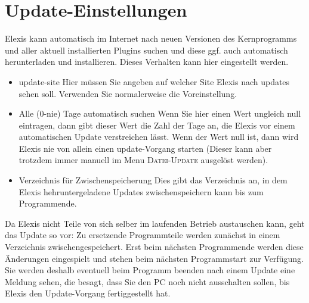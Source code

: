 \section{Update-Einstellungen}
Elexis kann automatisch im Internet nach neuen Versionen des Kernprogramms und aller aktuell installierten Plugins suchen und diese ggf. auch automatisch herunterladen und installieren. Dieses Verhalten kann hier eingestellt werden.
\begin{itemize}
\item{update-site} Hier müssen Sie angeben auf welcher Site Elexis nach updates sehen soll. Verwenden Sie normalerweise die Voreinstellung.
\item{Alle (0-nie) Tage automatisch suchen} Wenn Sie hier einen Wert ungleich null eintragen, dann gibt dieser Wert die Zahl der Tage an, die Elexis vor einem automatischen Update verstreichen lässt. Wenn der Wert null ist, dann wird Elexis nie von allein einen update-Vorgang starten (Dieser kann aber trotzdem immer manuell im Menu \textsc{Datei-Update} ausgelöst werden).
\item{Verzeichnis für Zwischenspeicherung} Dies gibt das Verzeichnis an, in dem Elexis hehruntergeladene Updates zwischenspeichern kann bis zum Programmende.
\end{itemize}
Da Elexis nicht Teile von sich selber im laufenden Betrieb austauschen kann, geht das Update so vor: Zu ersetzende Programmteile werden zunächst in einem Verzeichnis zwischengespeichert. Erst beim nächsten Programmende werden diese Änderungen eingespielt und stehen beim nächsten Programmstart zur Verfügung. Sie werden deshalb eventuell beim Programm beenden nach einem Update eine Meldung sehen, die besagt, dass Sie den PC noch nicht ausschalten sollen, bis Elexis den Update-Vorgang fertiggestellt hat.
